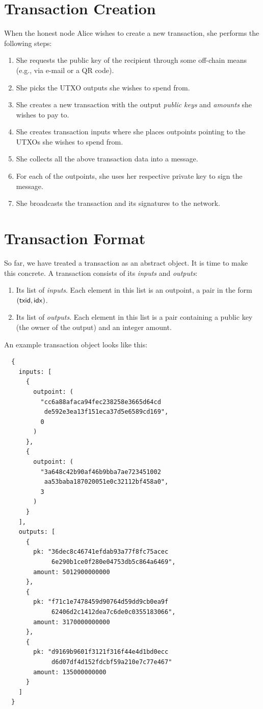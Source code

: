 \section{Transaction Creation}

When the honest node Alice wishes to create a new transaction, she performs the following steps:

\begin{enumerate}
  \item She requests the public key of the recipient through some off-chain means (e.g., via e-mail or a QR code).
  \item She picks the UTXO outputs she wishes to spend from.
  \item She creates a new transaction with the output \emph{public keys} and \emph{amounts} she wishes to pay to.
  \item She creates transaction inputs where she places outpoints pointing to the UTXOs she wishes to spend from.
  \item She collects all the above transaction data into a message.
  \item For each of the outpoints, she uses her respective private key to sign the message.
  \item She broadcasts the transaction and its signatures to the network.
\end{enumerate}

\section{Transaction Format}

So far, we have treated a transaction as an abstract object. It is time to make this concrete. A transaction
consists of its \emph{inputs} and \emph{outputs}:

\begin{enumerate}
  \item Its list of \emph{inputs}. Each element in this list is an outpoint, a pair in the form $(\mathsf{txid}, \mathsf{idx})$.
  \item Its list of \emph{outputs}. Each element in this list is a pair containing a public key
        (the owner of the output) and an integer amount.
\end{enumerate}

An example transaction object looks like this:

\begin{verbatim}
  {
    inputs: [
      {
        outpoint: (
          "cc6a88afaca94fec238258e3665d64cd
           de592e3ea13f151eca37d5e6589cd169",
          0
        )
      },
      {
        outpoint: (
          "3a648c42b90af46b9bba7ae723451002
           aa53baba187020051e0c32112bf458a0",
          3
        )
      }
    ],
    outputs: [
      {
        pk: "36dec8c46741efdab93a77f8fc75acec
             6e290b1ce0f280e04753db5c864a6469",
        amount: 5012900000000
      },
      {
        pk: "f71c1e7478459d90764d59dd9cb0ea9f
             62406d2c1412dea7c6de0c0355183066",
        amount: 3170000000000
      },
      {
        pk: "d9169b9601f3121f316f44e4d1bd0ecc
             d6d07df4d152fdcbf59a210e7c77e467"
        amount: 135000000000
      }
    ]
  }
\end{verbatim}

